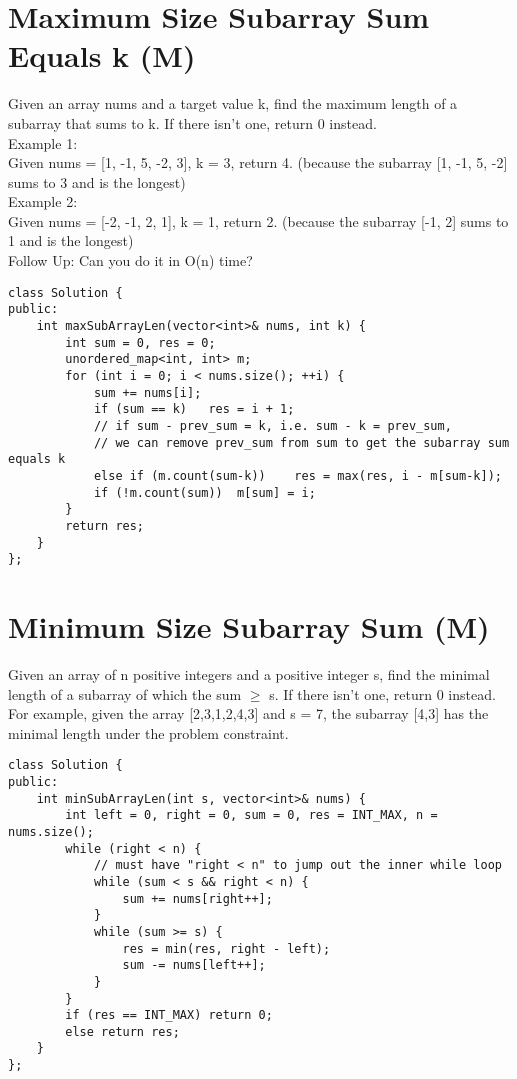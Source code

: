 \section{Maximum Size Subarray Sum Equals k (M)}
Given an array nums and a target value k, find the maximum length of a subarray that sums to k. If there isn't one, return 0 instead.\\

Example 1:\\
Given nums = [1, -1, 5, -2, 3], k = 3, return 4. (because the subarray [1, -1, 5, -2] sums to 3 and is the longest)\\

Example 2: \\
Given nums = [-2, -1, 2, 1], k = 1, return 2. (because the subarray [-1, 2] sums to 1 and is the longest) \\

Follow Up:
Can you do it in O(n) time? \\

\begin{lstlisting}
class Solution {
public:
    int maxSubArrayLen(vector<int>& nums, int k) {
        int sum = 0, res = 0;
        unordered_map<int, int> m;
        for (int i = 0; i < nums.size(); ++i) {
            sum += nums[i];
            if (sum == k)   res = i + 1;
            // if sum - prev_sum = k, i.e. sum - k = prev_sum,
            // we can remove prev_sum from sum to get the subarray sum equals k
            else if (m.count(sum-k))    res = max(res, i - m[sum-k]);
            if (!m.count(sum))  m[sum] = i;
        }
        return res;
    }
};
\end{lstlisting}


\section{Minimum Size Subarray Sum (M)}
Given an array of n positive integers and a positive integer s, find the minimal length of a subarray of which the sum $\geq$ s. If there isn't one, return 0 instead.\\

For example, given the array [2,3,1,2,4,3] and s = 7, the subarray [4,3] has the minimal length under the problem constraint. \\

\begin{lstlisting}
class Solution {
public:
    int minSubArrayLen(int s, vector<int>& nums) {
        int left = 0, right = 0, sum = 0, res = INT_MAX, n = nums.size();
        while (right < n) {
            // must have "right < n" to jump out the inner while loop
            while (sum < s && right < n) {  
                sum += nums[right++];
            }
            while (sum >= s) {
                res = min(res, right - left);
                sum -= nums[left++];
            }
        }
        if (res == INT_MAX) return 0;
        else return res;
    }
};
\end{lstlisting}


